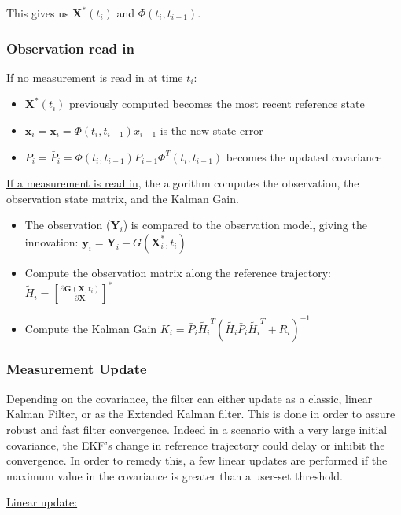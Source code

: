 \documentclass[]{BasiliskReportMemo}
\begin{document}
This gives us $\bm X^*(t_i)$ and $\Phi(t_{i}, t_{i-1})$.

\subsubsection*{Observation read in}

\underline{If no measurement is read in at time $t_i$:}

\begin{itemize}
\item $\bm X^*(t_i)$ previously computed becomes the most recent reference state
\item $\bm x_i = \bm \bar{x}_i = \Phi(t_{i}, t_{i-1}) x_{i-1}$ is the new state error 
\item $P_i = \bar{P}_i =\Phi(t_{i}, t_{i-1}) P_{i-1} \Phi^T(t_{i}, t_{i-1})$ becomes the updated covariance
\end{itemize}
\underline{If a measurement is read in}, the algorithm computes the observation, the observation state matrix, and the Kalman Gain.

\begin{itemize}
\item The observation ($\bm Y_i$) is compared to the observation model, giving the innovation: $\bm y_i = \bm Y_i - G(\bm X_i^*, t_i)$
\item Compute the observation matrix along the reference trajectory: $\tilde{H}_i = \left[\frac{\partial \bm G (\bm X, t_i)}{\partial \bm X}\right]^{*}$
\item Compute the Kalman Gain $K_i = \bar{P}_i \tilde{H_i}^T\left(\tilde{H_i} \bar{P}_i \tilde{H_i}^T + R_i \right)^{-1}$
\end{itemize}

\subsubsection*{Measurement Update}

Depending on the covariance, the filter can either update as a classic, linear Kalman Filter, or as the Extended Kalman filter.
This is done in order to assure robust and fast filter convergence. Indeed in a scenario with a very large initial covariance, the EKF's
change in reference trajectory could delay or inhibit the convergence. In order to remedy this, a few linear updates are performed if the 
maximum value in the covariance is greater than a user-set threshold.

\underline{Linear update:}
\end{document}
